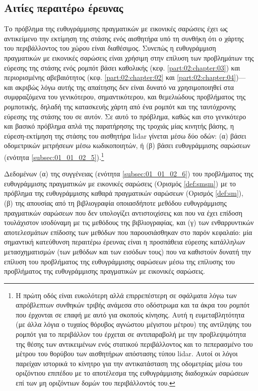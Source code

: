 \subsection{Αιτίες περαιτέρω έρευνας}
\label{subsection:02_04_07:02}

Το πρόβλημα της ευθυγράμμισης πραγματικών με εικονικές σαρώσεις έχει ως
αντικείμενο την εκτίμηση της στάσης ενός αισθητήρα υπό τη συνθήκη ότι ο χάρτης
του περιβάλλοντος του χώρου είναι διαθέσιμος. Συνεπώς η ευθυγράμμιση
πραγματικών με εικονικές σαρώσεις είναι χρήσιμη στην επίλυση των προβλημάτων
της εύρεσης της στάσης ενός ρομπότ βάσει καθολικής (κεφ.
\ref{part:02:chapter:03}) και περιορισμένης αβεβαιότητος (κεφ.
\ref{part:02:chapter:02} και \ref{part:02:chapter:04})---και ακριβώς λόγω αυτής
της απαίτησης δεν είναι δυνατό να χρησιμοποιηθεί στα συμφραζόμενα του
γενικότερου, σημαντικότερου, και θεμελιώδους προβλήματος της ρομποτικής, δηλαδή
της κατασκευής χάρτη από ένα ρομπότ και της ταυτόχρονης εύρεσης της στάσης του
σε αυτόν. Σε αυτό το πρόβλημα, καθώς και στο γενικότερο και βασικό πρόβλημα
απλά της παρατήρησης της τροχιάς μίας κινητής βάσης, η εύρεση-εκτίμηση της
στάσης του αισθητήρα lidar γίνεται μέσω δύο οδών: (α) βάσει οδομετρικών
μετρήσεων μέσω κωδικοποιητών, ή (β) βάσει ευθυγράμμισης σαρώσεων (ενότητα
\ref{subsec:01_01_02_5}).\footnote{Η πρώτη οδός είναι ευκολότερη αλλά
επιρρεπέστερη σε σφάλματα λόγω των απρόβλεπτων συνθηκών τριβής ανάμεσα στο
οδόστρωμα και τα άκρα του ρομπότ που έρχονται σε επαφή με αυτό για σκοπούς
κίνησης. Αυτή η ευμεταβλητότητα (με άλλα λόγια ο τυχαίος θόρυβος αγνώστου
μέγιστου μέτρου) της αντίληψης του ρομπότ για το περιβάλλον του έρχεται σε
αντιπαραβολή με την προβλεψιμότητα της θέσης των αντικειμένων ενός στατικού
περιβάλλοντος και το πεπερασμένο του μέτρου του θορύβου των αισθητήρων
απόστασης τύπου lidar. Αυτοί οι λόγοι παρείχαν ιστορικά το κίνητρο για την
αντικατάσταση της οδομετρίας μέσω του οριζόντιου επιπέδου με το αποτέλεσμα της
ευθυγράμμισης διαδοχικών σαρώσεων επί των μη οριζόντιων δομών του περιβάλλοντός
του.}

Δεδομένων (α) της συγγένειας (ενότητα \ref{subsec:01_01_02_6}) του προβλήματος
της ευθυγράμμισης πραγματικών με εικονικές σαρώσεις (Ορισμός \ref{def:smsm}) με
το πρόβλημα της ευθυγράμμισης καθαρά πραγματικών σαρώσεων (Ορισμός
\ref{def:sm}), (β) της απουσίας από τη βιβλιογραφία οποιασδήποτε μεθόδου
ευθυγράμμισης πραγματικών σαρώσεων που δεν υπολογίζει αντιστοιχίσεις και που να
έχει επίδοση τουλάχιστον ισοδύναμη με τις μεθόδους της βιβλιογραφίας, και (γ)
των ενθαρρυντικών αποτελεσμάτων επίδοσης των μεθόδων που παρουσιάσθηκαν στο
παρόν κεφαλαίο: μία σημαντική κατεύθυνση περαιτέρω έρευνας είναι η προσπάθεια
εύρεσης κατάλληλων μετασχηματισμών (των μεθόδων και των εισόδων τους) που να
καθιστούν δυνατή την επίλυση του προβλήματος της ευθυγράμμισης σαρώσεων μέσω
της επίλυσης του προβλήματος της ευθυγράμμισης πραγματικών με εικονικές
σαρώσεις.
